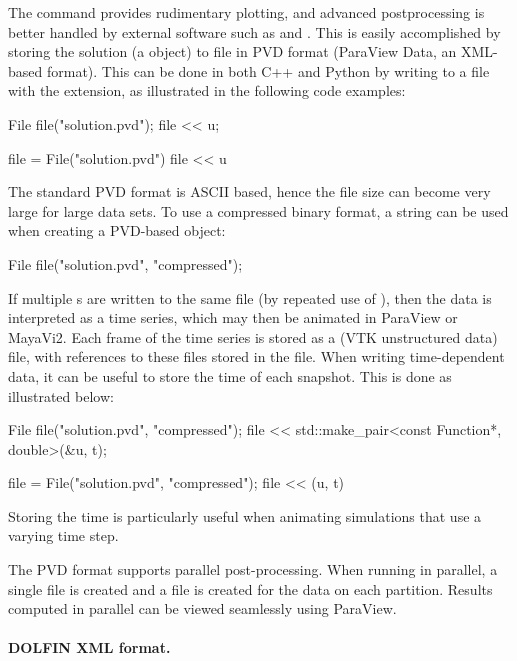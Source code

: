 The  command provides rudimentary plotting, and advanced
postprocessing is better handled by external software such as
\citet{www:paraview} and \citet{www:mayavi}. This is easily
accomplished by storing the solution (a  object) to file
in PVD format (ParaView Data, an XML-based format). This can be done
in both C++ and Python by writing to a file with the 
extension, as illustrated in the following code examples:
\begin{c++}
File file("solution.pvd");
file << u;
\end{c++}
\begin{python}
file = File("solution.pvd")
file << u
\end{python}
The standard PVD format is ASCII based, hence the file size can
become very large for large data sets. To use a compressed binary
format, a string  can be used when creating a
PVD-based  object:
\begin{c++}
File file("solution.pvd", "compressed");
\end{c++}
If multiple s are written to the same file (by repeated
use of \emp{<{}<}), then the data is interpreted as a time series,
which may then be animated in ParaView or MayaVi2. Each frame of the
time series is stored as a  (VTK unstructured data) file,
with references to these files stored in the  file.  When
writing time-dependent data, it can be useful to store the time
 of each snapshot. This is done as illustrated below:
\begin{c++}
File file("solution.pvd", "compressed");
file << std::make_pair<const Function*, double>(&u, t);
\end{c++}
\begin{python}
file = File("solution.pvd", "compressed");
file << (u, t)
\end{python}
Storing the time is particularly useful when animating simulations that
use a varying time step.

The PVD format supports parallel post-processing. When running in
parallel, a single  file is created and a  file is
created for the data on each partition. Results computed in parallel
can be viewed seamlessly using ParaView.


\paragraph{DOLFIN XML format.}

